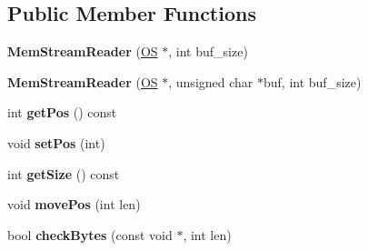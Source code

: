 \subsection*{Public Member Functions}
\begin{DoxyCompactItemize}
\item 
{\bfseries Mem\+Stream\+Reader} (\hyperlink{class_object_script_1_1_o_s}{OS} $\ast$, int buf\+\_\+size)\hypertarget{class_object_script_1_1_o_s_1_1_core_1_1_mem_stream_reader_a28f7fbf7c8d589ab30bc805b44aee2cc}{}\label{class_object_script_1_1_o_s_1_1_core_1_1_mem_stream_reader_a28f7fbf7c8d589ab30bc805b44aee2cc}

\item 
{\bfseries Mem\+Stream\+Reader} (\hyperlink{class_object_script_1_1_o_s}{OS} $\ast$, unsigned char $\ast$buf, int buf\+\_\+size)\hypertarget{class_object_script_1_1_o_s_1_1_core_1_1_mem_stream_reader_a244d42e1ba12534481b463a4f6040b0e}{}\label{class_object_script_1_1_o_s_1_1_core_1_1_mem_stream_reader_a244d42e1ba12534481b463a4f6040b0e}

\item 
int {\bfseries get\+Pos} () const \hypertarget{class_object_script_1_1_o_s_1_1_core_1_1_mem_stream_reader_ab2e364c9947bc480895e47490f71337c}{}\label{class_object_script_1_1_o_s_1_1_core_1_1_mem_stream_reader_ab2e364c9947bc480895e47490f71337c}

\item 
void {\bfseries set\+Pos} (int)\hypertarget{class_object_script_1_1_o_s_1_1_core_1_1_mem_stream_reader_aeb14f2280112bbaae3ce4aef0464dc49}{}\label{class_object_script_1_1_o_s_1_1_core_1_1_mem_stream_reader_aeb14f2280112bbaae3ce4aef0464dc49}

\item 
int {\bfseries get\+Size} () const \hypertarget{class_object_script_1_1_o_s_1_1_core_1_1_mem_stream_reader_af04e2aefb78626326be92106933025a7}{}\label{class_object_script_1_1_o_s_1_1_core_1_1_mem_stream_reader_af04e2aefb78626326be92106933025a7}

\item 
void {\bfseries move\+Pos} (int len)\hypertarget{class_object_script_1_1_o_s_1_1_core_1_1_mem_stream_reader_af400bf83e7b633913d5d0529d51c7a2b}{}\label{class_object_script_1_1_o_s_1_1_core_1_1_mem_stream_reader_af400bf83e7b633913d5d0529d51c7a2b}

\item 
bool {\bfseries check\+Bytes} (const void $\ast$, int len)\hypertarget{class_object_script_1_1_o_s_1_1_core_1_1_mem_stream_reader_af2343fd460c881c6469e475c9ea2ebbb}{}\label{class_object_script_1_1_o_s_1_1_core_1_1_mem_stream_reader_af2343fd460c881c6469e475c9ea2ebbb}


\end{DoxyCompactItemize}
